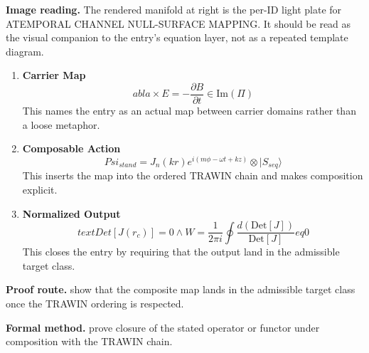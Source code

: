 \begin{samepage}
\noindent\begin{minipage}[t]{0.45\linewidth}
\vspace{0pt}
\raggedright
\scriptsize\textbf{Image reading.} The rendered manifold at right is the per-ID light plate for ATEMPORAL CHANNEL NULL-SURFACE MAPPING. It should be read as the visual companion to the entry's equation layer, not as a repeated template diagram.\par
\end{minipage}\hfill
\begin{minipage}[t]{0.53\linewidth}
\vspace*{-0.10in}
\raggedright
{}
\end{minipage}
\end{samepage}

\clearpage


\begin{enumerate}[leftmargin=1.6em,itemsep=9pt,topsep=6pt]
\item \textbf{Carrier Map}
\[
abla \times E = -\frac{\partial B}{\partial t} \in \text{Im}(\Pi)
\]
This names the entry as an actual map between carrier domains rather than a loose metaphor.

\item \textbf{Composable Action}
\[
Psi_{stand} = J_n(kr) e^{i(m\phi - \omega t + kz)} \otimes |S_{seq}\rangle
\]
This inserts the map into the ordered TRAWIN chain and makes composition explicit.

\item \textbf{Normalized Output}
\[
text{Det}[J(r_c)] = 0 \land W = \frac{1}{2\pi i} \oint \frac{d(\text{Det}[J])}{\text{Det}[J]}  eq 0
\]
This closes the entry by requiring that the output land in the admissible target class.
\end{enumerate}

\textbf{Proof route.} show that the composite map lands in the admissible target class once the TRAWIN ordering is respected.

\textbf{Formal method.} prove closure of the stated operator or functor under composition with the TRAWIN chain.

\medskip
{}

